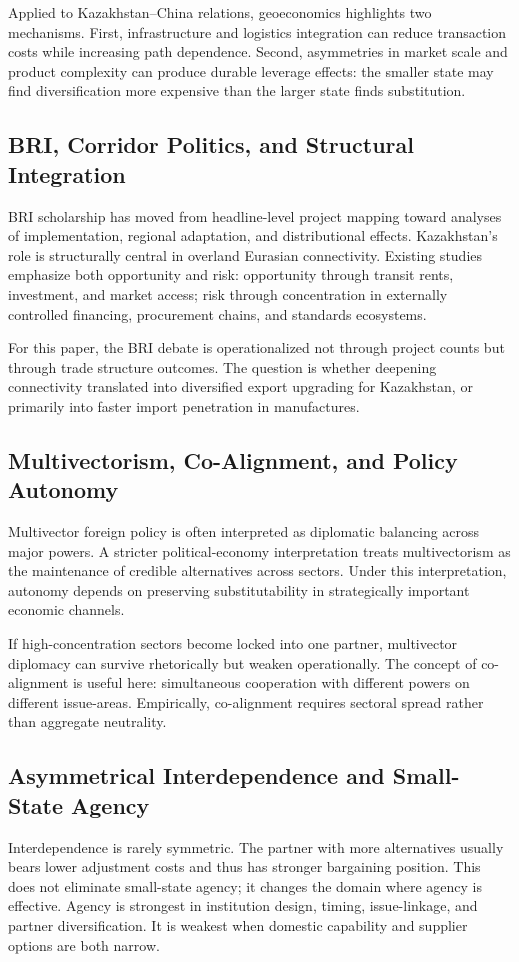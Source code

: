 \documentclass[12pt]{article}
\begin{document}
Applied to Kazakhstan--China relations, geoeconomics highlights two mechanisms. First, infrastructure and logistics integration can reduce transaction costs while increasing path dependence. Second, asymmetries in market scale and product complexity can produce durable leverage effects: the smaller state may find diversification more expensive than the larger state finds substitution.

\subsection{BRI, Corridor Politics, and Structural Integration}
BRI scholarship has moved from headline-level project mapping toward analyses of implementation, regional adaptation, and distributional effects. Kazakhstan's role is structurally central in overland Eurasian connectivity. Existing studies emphasize both opportunity and risk: opportunity through transit rents, investment, and market access; risk through concentration in externally controlled financing, procurement chains, and standards ecosystems.

For this paper, the BRI debate is operationalized not through project counts but through trade structure outcomes. The question is whether deepening connectivity translated into diversified export upgrading for Kazakhstan, or primarily into faster import penetration in manufactures.

\subsection{Multivectorism, Co-Alignment, and Policy Autonomy}
Multivector foreign policy is often interpreted as diplomatic balancing across major powers. A stricter political-economy interpretation treats multivectorism as the maintenance of credible alternatives across sectors. Under this interpretation, autonomy depends on preserving substitutability in strategically important economic channels.

If high-concentration sectors become locked into one partner, multivector diplomacy can survive rhetorically but weaken operationally. The concept of co-alignment is useful here: simultaneous cooperation with different powers on different issue-areas. Empirically, co-alignment requires sectoral spread rather than aggregate neutrality.

\subsection{Asymmetrical Interdependence and Small-State Agency}
Interdependence is rarely symmetric. The partner with more alternatives usually bears lower adjustment costs and thus has stronger bargaining position. This does not eliminate small-state agency; it changes the domain where agency is effective. Agency is strongest in institution design, timing, issue-linkage, and partner diversification. It is weakest when domestic capability and supplier options are both narrow.
\end{document}
